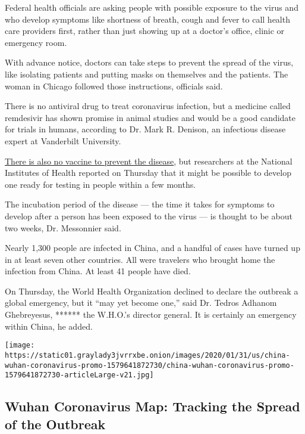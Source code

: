 Federal health officials are asking people with possible exposure to the
virus and who develop symptoms like shortness of breath, cough and fever
to call health care providers first, rather than just showing up at a
doctor's office, clinic or emergency room.

With advance notice, doctors can take steps to prevent the spread of the
virus, like isolating patients and putting masks on themselves and the
patients. The woman in Chicago followed those instructions, officials
said.

There is no antiviral drug to treat coronavirus infection, but a
medicine called remdesivir has shown promise in animal studies and would
be a good candidate for trials in humans, according to Dr. Mark R.
Denison, an infectious disease expert at Vanderbilt University.

\href{https://www.nytimes3xbfgragh.onion/2020/01/28/health/coronavirus-vaccine.html}{There
is also no vaccine to prevent the disease}, but researchers at the
National Institutes of Health reported on Thursday that it might be
possible to develop one ready for testing in people within a few months.

The incubation period of the disease --- the time it takes for symptoms
to develop after a person has been exposed to the virus --- is thought
to be about two weeks, Dr. Messonnier said.

Nearly 1,300 people are infected in China, and a handful of cases have
turned up in at least seven other countries. All were travelers who
brought home the infection from China. At least 41 people have died.

On Thursday, the World Health Organization declined to declare the
outbreak a global emergency, but it ``may yet become one,'' said Dr.
Tedros Adhanom Ghebreyesus, ****** the W.H.O.'s director general. It is
certainly an emergency within China, he added.

\href{https://www.nytimes3xbfgragh.onion/interactive/2020/01/21/world/asia/china-coronavirus-maps.html}{}

\texttt{[image: https://static01.graylady3jvrrxbe.onion/images/2020/01/31/us/china-wuhan-coronavirus-promo-1579641872730/china-wuhan-coronavirus-promo-1579641872730-articleLarge-v21.jpg]}

\hypertarget{wuhan-coronavirus-map-tracking-the-spread-of-the-outbreak}{%
\subsection{Wuhan Coronavirus Map: Tracking the Spread of the
Outbreak}\label{wuhan-coronavirus-map-tracking-the-spread-of-the-outbreak}}

